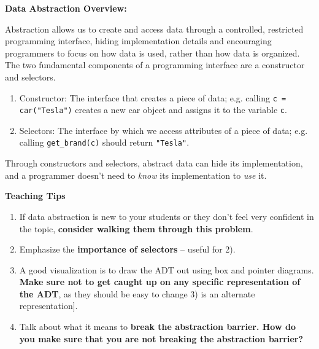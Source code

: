 \textbf{Data Abstraction Overview:}

Abstraction allows us to create and access data through a controlled, restricted programming interface, hiding implementation details and encouraging programmers to focus on how data is used, rather than how data is organized. The two fundamental components of a programming interface are a constructor and selectors.
\begin{enumerate}
	\item Constructor: The interface that creates a piece of data; e.g. calling \texttt{c = car("Tesla")} creates a new car object and assigns it to the variable \texttt{c}.
	\item Selectors: The interface by which we access attributes of a piece of data; e.g. calling \lstinline{get_brand(c)} should return \lstinline{"Tesla"}.
\end{enumerate}

Through constructors and selectors, abstract data can hide its implementation, and a programmer doesn’t need to {\it know} its implementation to {\it use} it.

\begin{blocksection}
	\begin{guide}
	\textbf{Teaching Tips}
	\begin{enumerate}
		\item If data abstraction is new to your students or they don’t feel very confident in the topic, \textbf{consider walking them through this problem}.
        \item Emphasize the \textbf{importance of selectors} -- useful for 2).
        \item A good visualization is to draw the ADT out using box and pointer diagrams. \textbf{Make sure not to get caught up on any specific representation of the ADT}, as they should be easy to change 3) is an alternate representation].
        \item Talk about what it means to \textbf{break the abstraction barrier. How do you make sure that you are not breaking the abstraction barrier?}
	\end{enumerate}
	\end{guide}
\end{blocksection}
